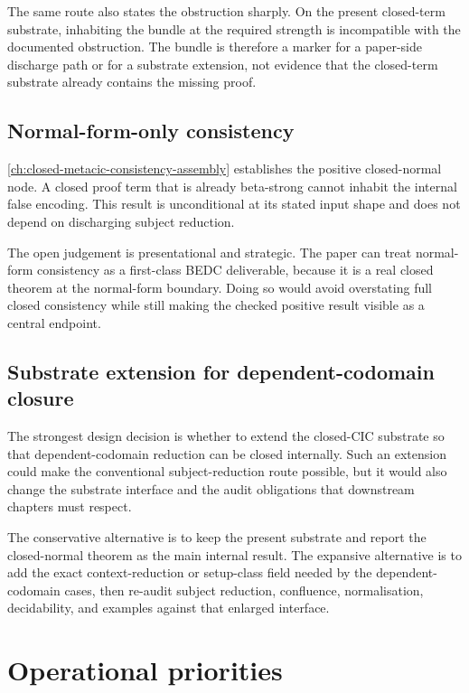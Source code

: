 The same route also states the obstruction sharply. On the present closed-term
substrate, inhabiting the bundle at the required strength is incompatible with
the documented obstruction. The bundle is therefore a marker for a
paper-side discharge path or for a substrate extension, not evidence that the
closed-term substrate already contains the missing proof.

\subsection{Normal-form-only consistency}
\label{subsec:metacic-open-problems-normal-form-consistency}

\autoref{ch:closed-metacic-consistency-assembly} establishes the positive
closed-normal node. A closed proof term that is already beta-strong cannot
inhabit the internal false encoding. This result is unconditional at its
stated input shape and does not depend on discharging subject reduction.

The open judgement is presentational and strategic. The paper can treat
normal-form consistency as a first-class BEDC deliverable, because it is a real
closed theorem at the normal-form boundary. Doing so would avoid overstating
full closed consistency while still making the checked positive result visible
as a central endpoint.

\subsection{Substrate extension for dependent-codomain closure}
\label{subsec:metacic-open-problems-substrate-extension}

The strongest design decision is whether to extend the closed-CIC substrate so
that dependent-codomain reduction can be closed internally. Such an extension
could make the conventional subject-reduction route possible, but it would also
change the substrate interface and the audit obligations that downstream
chapters must respect.

The conservative alternative is to keep the present substrate and report the
closed-normal theorem as the main internal result. The expansive alternative is
to add the exact context-reduction or setup-class field needed by the
dependent-codomain cases, then re-audit subject reduction, confluence,
normalisation, decidability, and examples against that enlarged interface.

\section{Operational priorities}
\label{sec:metacic-open-problems-operational-priorities}


